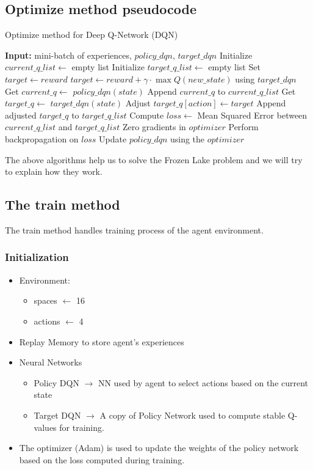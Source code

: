 \subsection{Optimize method pseudocode}
\begin{algorithm}[H]
    \caption{Optimize method for Deep Q-Network (DQN)}
    \begin{algorithmic}[1]
    \State \textbf{Input:} mini-batch of experiences, $policy\_dqn$, $target\_dqn$
    \State Initialize $current\_q\_list \gets$ empty list
    \State Initialize $target\_q\_list \gets$ empty list
            \State Set $target \gets reward$
        \Else
            \State $target \gets reward + \gamma \cdot \max Q(new\_state)$ using $target\_dqn$
        \EndIf
        \State Get $current\_q \gets$ $policy\_dqn(state)$
        \State Append $current\_q$ to $current\_q\_list$
        \State Get $target\_q \gets$ $target\_dqn(state)$
        \State Adjust $target\_q[action] \gets target$
        \State Append adjusted $target\_q$ to $target\_q\_list$
    \EndFor
    \State Compute $loss \gets$ Mean Squared Error between $current\_q\_list$ and $target\_q\_list$
    \State Zero gradients in $optimizer$
    \State Perform backpropagation on $loss$
    \State Update $policy\_dqn$ using the $optimizer$
    \end{algorithmic}
    \end{algorithm}
    
    The above algorithms help us to solve the Frozen Lake problem and we will try to explain how they work.
    \subsection{The train method}
    The train method handles training process of the agent environment.
    \subsubsection{Initialization}
    \begin{itemize}
        \item Environment:
        \begin{itemize}
            \item spaces $\leftarrow$ 16
            \item actions $\leftarrow$ 4
        \end{itemize}
        \item Replay Memory to store agent's experiences
        \item Neural Networks
        \begin{itemize}
            \item Policy DQN $\rightarrow$ NN used by agent to select actions based on the current state
            \item Target DQN $\rightarrow$ A copy of Policy Network used to compute stable Q-values for training.
        \end{itemize}
        \item The optimizer (Adam) is used to update the weights of the policy network based on the loss computed during training.
    \end{itemize}
